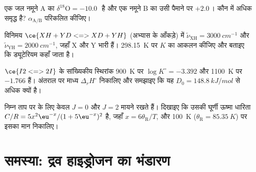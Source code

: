 \begin{exercise}[$\star\star$]\label{exo:b3:statistical-thermo-applied:9}
एक जल नमूने A का $\delta^{18}\mathrm O = -10.0$\,\textperthousand\ है और एक नमूने B का
उसी पैमाने पर $+2.0$\,\textperthousand। कौन  में अधिक समृद्ध है?
 $\alpha_{\mathrm{A/B}}$ परिकलित कीजिए।
\end{exercise}

\begin{exercise}[$\star\star\star$]\label{exo:b3:statistical-thermo-applied:10}
विनिमय $\ce{XH + YD <=> XD + YH}$ (अभ्यास के आँकड़े) में $\tilde\nu_{\mathrm{XH}} =
\qty{3000}{cm^{-1}}$ और $\tilde\nu_{\mathrm{YH}} = \qty{2000}{cm^{-1}}$, जहाँ X और Y भारी हैं। \qty{298.15}{K} पर $K$
का आकलन कीजिए और बताइए कि ड्यूटेरियम कहाँ जाता है।
\end{exercise}

\begin{exercise}[$\star\star\star$]\label{exo:b3:statistical-thermo-applied:11}
$\ce{I2 <=> 2 I}$ के सांख्यिकीय स्थिरांक \qty{900}{K} पर $\log K^\circ = -3.392$ और
\qty{1100}{K} पर $-1.766$ हैं। अंतराल पर माध्य $\Delta_rH^\circ$ निकालिए और समझाइए कि
यह $D_0 = \qty{148.8}{kJ/mol}$ से अधिक क्यों है।
\end{exercise}

\begin{exercise}[$\star\star\star$]\label{exo:b3:statistical-thermo-applied:12}
निम्न ताप पर  के लिए केवल $J = 0$ और $J = 2$ मायने रखते हैं। दिखाइए कि
उसकी घूर्णी ऊष्मा धारिता $C/R = 5x^2\eu^{-x}/(1 + 5\eu^{-x})^2$ है, जहाँ $x = 6\theta_{\mathrm R}/T$, और
\qty{100}{K} ($\theta_{\mathrm R} = \qty{85.35}{K}$) पर इसका मान निकालिए।
\end{exercise}

\section{समस्या: द्रव हाइड्रोजन का भंडारण}

